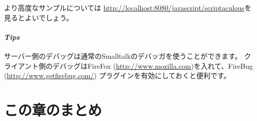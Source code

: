\documentclass[a4paper,10pt,twoside]{book}
\begin{document}
より高度なサンプルについては \url{http://localhost:8080/javascript/scriptaculous}を見るとよいでしょう。

\paragraph{\emph{Tips}}
サーバー側のデバッグは通常のSmalltalkのデバッガを使うことができます。
クライアント側のデバッグはFireFox (\url{http://www.mozilla.com})を入れて、FireBug (\url{http://www.getfirebug.com/}) プラグインを有効にしておくと便利です。

\section{この章のまとめ}

\end{document}
